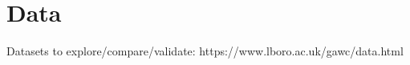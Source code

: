 \documentclass{article}
\begin{document}










\section{Data}

Datasets to explore/compare/validate: https://www.lboro.ac.uk/gawc/data.html


\end{document}
